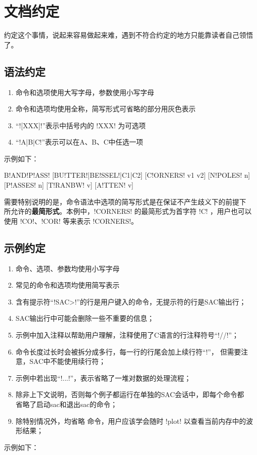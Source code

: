 \section{文档约定}
约定这个事情，说起来容易做起来难，遇到不符合约定的地方只能靠读者自己领悟了。

\subsection*{语法约定}
\begin{enumerate}
\item 命令和选项使用大写字母，参数使用小写字母
\item 命令和选项均使用全称，简写形式可省略的部分用灰色表示
\item ``![XXX]!''表示中括号内的 !XXX! 为可选项
\item ``!A|B|C!''表示可以在A、B、C中任选一项
\end{enumerate}

示例如下：
\begin{SACSTX}
B!AND!P!ASS! [BU!TTER!|BE!SSEL!|C1|C2] [C!ORNERS! v1 v2] [N!POLES! n] [P!ASSES! n]
    [T!RANBW! v] [A!TTEN! v]
\end{SACSTX}

需要特别说明的是，命令语法中选项的简写形式是在保证不产生歧义下的前提下
所允许的\textbf{最简形式}。本例中，!CORNERS! 的最简形式为首字符
!C! ，用户也可以使用 !CO!、!COR! 等来表示 !CORNERS!。

\subsection*{示例约定}
\begin{enumerate}
\item 命令、选项、参数均使用小写字母
\item 常见的命令和选项均使用简写表示
\item 含有提示符``!SAC>!''的行是用户键入的命令，无提示符的行是SAC输出行；
\item SAC输出行中可能会删除一些不重要的信息；
\item 示例中加入注释以帮助用户理解，注释使用了C语言的行注释符号``!//!''；
\item 命令长度过长时会被拆分成多行，每一行的行尾会加上续行符``!\!''，
    但需要注意，SAC中不能使用续行符；
\item 示例中若出现``!...!''，表示省略了一堆对数据的处理流程；
\item 除非上下文说明，否则每个例子都运行在单独的SAC会话中，即每个命令都
    省略了启动sac和退出sac的命令；
\item 除特别情况外，均省略  命令，用户应该学会随时
    !plot! 以查看当前内存中的波形结果；
\end{enumerate}

示例如下：
